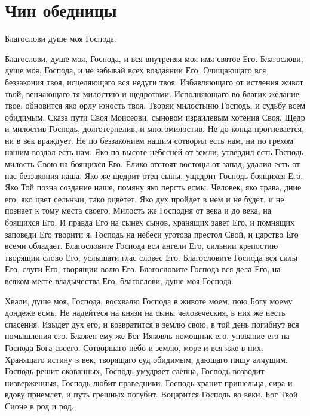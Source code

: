 \section{Чин обедницы}\begin{mymulticols}





Благослови душе моя Господа. 





Благослови, душе моя, Господа, и вся внутреняя моя имя святое Его. Благослови, душе моя, Господа, и не забывай всех воздаянии Его. Очищающаго вся беззакония твоя, исцеляющаго вся недуги твоя. Избавляющаго от истления живот твой, венчающаго тя милостию и щедротами. Исполняющаго во благих желание твое, обновится яко орлу юность твоя. Творяи милостыню Господь, и судьбу всем обидимым. Сказа пути Своя Моисеови, сыновом израилевым хотения Своя. Щедр и милостив Господь, долготерпелив, и многомилостив. Не до конца прогневается, ни в век враждует. Не по беззаконием нашим сотворил есть нам, ни по грехом нашим воздал есть нам. Яко по высоте небесней от земли, утвердил есть Господь милость Свою на боящихся Его. Елико отстоят востоцы от запад, удалил есть от нас беззакония наша. Яко же щедрит отец сыны, ущедрит Господь боящихся Его. Яко Той позна создание наше, помяну яко персть есмы. Человек, яко трава, дние его, яко цвет сельныи, тако оцветет. Яко дух пройдет в нем и не будет, и не познает к тому места своего. Милость же Господня от века и до века, на боящихся Его. И правда Его на сынех сынов, хранящих завет Его, и помнящих заповеди Его творити я. Господь на небеси уготова престол Свой, и царство Его всеми обладает. Благословите Господа вси ангели Его, сильнии крепостию творящии слово Его, услышати глас словес Его. Благословите Господа вся силы Его, слуги Его, творящии волю Его. Благословите Господа вся дела Его, на всяком месте владычества Его, благослови, душе моя Господа.




Хвали, душе моя, Господа, восхвалю Господа в животе моем, пою Богу моему дондеже есмь. Не надейтеся на князи на сыны человеческия, в них же несть спасения. Изыдет дух его, и возвратится в землю свою, в той день погибнут вся помышления его. Блажен ему же Бог Ияковль помощник его, упование его на Господа Бога своего. Сотворшаго небо и землю, море и вся яже в них. Хранящаго истину в век, творящаго суд обидимым, дающаго пищу алчущим. Господь решит окованных, Господь умудряет слепца, Господь возводит низверженныя, Господь любит праведники. Господь хранит пришельца, сира и вдову приемлет, и путь грешных погубит. Воцарится Господь во веки. Бог Твой Сионе в род и род. 


\end{mymulticols}

